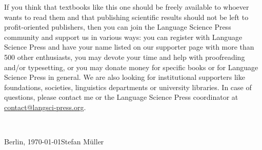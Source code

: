 If you think that textbooks like this one should be freely available to whoever wants to read them
and that publishing scientific results should not be left to profit-oriented publishers, then you
can join the Language Science Press community and support us in various ways: you can register with Language Science Press and have your name
listed on our supporter page with more than 500 other enthusiasts, you may devote your time and help
with proofreading and/or typesetting, or you may donate money for specific books or for Language
Science Press in general. We are also looking for institutional supporters like foundations,
societies, linguistics departments or university libraries. In case of questions, please contact me
or the Language Science Press coordinator at \href{mailto:contact@langsci-press.org}{contact@langsci-press.org}.


~\medskip

\noindent
Berlin, \today\hfill Stefan Müller


